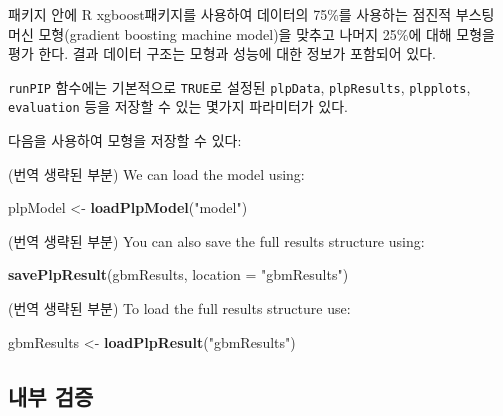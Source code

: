 \documentclass[11pt]{book}
\newenvironment{Shaded}{\begin{snugshade}}{\end{snugshade}}
\newcommand{\KeywordTok}[1]{\textcolor[rgb]{0.13,0.29,0.53}{\textbf{#1}}}
\newcommand{\DataTypeTok}[1]{\textcolor[rgb]{0.13,0.29,0.53}{#1}}
\newcommand{\StringTok}[1]{\textcolor[rgb]{0.31,0.60,0.02}{#1}}
\newcommand{\OperatorTok}[1]{\textcolor[rgb]{0.81,0.36,0.00}{\textbf{#1}}}
\newcommand{\NormalTok}[1]{#1}
\theoremstyle{definition}
\theoremstyle{definition}
\theoremstyle{definition}
\theoremstyle{remark}
\begin{document}
패키지 안에 R xgboost패키지를 사용하여 데이터의 75\%를 사용하는 점진적
부스팅 머신 모형(gradient boosting machine model)을 맞추고 나머지 25\%에
대해 모형을 평가 한다. 결과 데이터 구조는 모형과 성능에 대한 정보가
포함되어 있다.

\texttt{runPIP} 함수에는 기본적으로 \texttt{TRUE}로 설정된
\texttt{plpData}, \texttt{plpResults}, \texttt{plpplots},
\texttt{evaluation} 등을 저장할 수 있는 몇가지 파라미터가 있다.

다음을 사용하여 모형을 저장할 수 있다:

\begin{Shaded}
\end{Shaded}

(번역 생략된 부분) We can load the model using:

\begin{Shaded}
\begin{Highlighting}[]
\NormalTok{plpModel <-}\StringTok{ }\KeywordTok{loadPlpModel}\NormalTok{(}\StringTok{"model"}\NormalTok{)}
\end{Highlighting}
\end{Shaded}

(번역 생략된 부분) You can also save the full results structure using:

\begin{Shaded}
\begin{Highlighting}[]
\KeywordTok{savePlpResult}\NormalTok{(gbmResults, }\DataTypeTok{location =} \StringTok{"gbmResults"}\NormalTok{)}
\end{Highlighting}
\end{Shaded}

(번역 생략된 부분) To load the full results structure use:

\begin{Shaded}
\begin{Highlighting}[]
\NormalTok{gbmResults <-}\StringTok{ }\KeywordTok{loadPlpResult}\NormalTok{(}\StringTok{"gbmResults"}\NormalTok{)}
\end{Highlighting}
\end{Shaded}

\subsection{내부 검증}\label{-}
\end{document}
